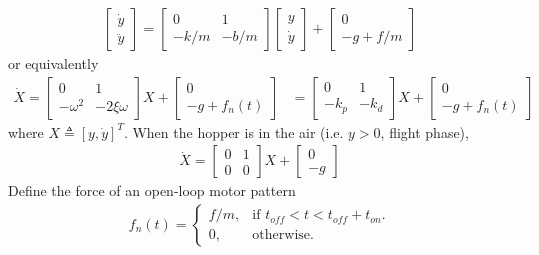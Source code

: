 \begin{align}
\begin{bmatrix}
\dot y  \\
\ddot y 
\end{bmatrix} = \begin{bmatrix}
0 & 1 \\
-k/m & -b/m
\end{bmatrix}\begin{bmatrix}
 y  \\
\dot y 
\end{bmatrix} + 
\begin{bmatrix}
0  \\
-g+f/m 
\end{bmatrix}
\end{align}
or equivalently
\begin{align}
\label{eq:groundEOM}
\dot X = \begin{bmatrix}
0 & 1 \\
-\omega^2 & -2\xi\omega
\end{bmatrix}X + 
\begin{bmatrix}
0  \\
-g+f_n(t)
\end{bmatrix} &= \begin{bmatrix}
0 & 1 \\
-k_p & -k_d
\end{bmatrix}X + 
\begin{bmatrix}
0  \\
-g+f_n(t)
\end{bmatrix}
\end{align}
where $X \triangleq [y,\dot y]^T$.
When the hopper is in the air (i.e. $y> 0$, flight phase), 
\begin{align}
\label{eq:airEOM}
\dot X = \begin{bmatrix}
0 & 1 \\
0 & 0
\end{bmatrix}X + 
\begin{bmatrix}
0  \\
-g 
\end{bmatrix}
\end{align}
\noindent Define the force  of an open-loop motor pattern
\begin{align}
 f_n(t)=\begin{cases}
    f/m, & \text{if $t_{off}<t<t_{off}+t_{on}$}.\\
    0, & \text{otherwise}.
  \end{cases}
\end{align}
%
